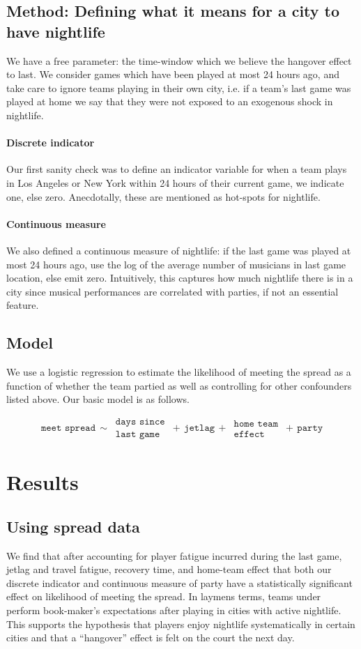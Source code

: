 \documentclass[letterpaper,12pt]{article}
\begin{document}
\subsection{Method: Defining what it means for a city to have nightlife}
We have a free parameter: the time-window which we believe the hangover effect
to last. We consider games which have been played at most 24 hours ago, and take care to ignore
teams playing in their own city, i.e. if a team's last game was played at home  we say that they were not exposed to an exogenous shock in nightlife.

\paragraph{Discrete indicator}
Our first sanity check was to define an indicator variable for when a team plays in 
Los Angeles or New York within 24 hours of their current game, we indicate one, else zero. Anecdotally, these are mentioned as hot-spots for
nightlife.

\paragraph{Continuous measure}
We also defined a continuous measure of nightlife:
if the last game was played at most 24 hours ago, use the log of the average number
of musicians in last game location, else emit zero. Intuitively, this captures
how much nightlife there is in a city since musical performances are correlated
with parties, if not an essential feature.

\subsection{Model} We use a logistic regression to estimate the likelihood of meeting
the spread as a function of whether the team partied as well as controlling for other confounders
listed above. Our basic model is as follows.

\[
\texttt{meet spread} \,  \sim \, \substack{\texttt{days since} \\ \texttt{last game}} \, + \, \texttt{jetlag} \, + \, \substack{\texttt{home team} \\ \texttt{effect}} \, + \, \texttt{party}
\]

\section{Results}
\subsection{Using spread data}
We find that after accounting for player fatigue incurred during the last game, jetlag and travel fatigue, recovery time, and home-team effect that both our discrete indicator and continuous measure of party
have a statistically significant effect on likelihood of meeting the spread.
In laymens terms, teams under perform book-maker's expectations after playing in cities 
with active nightlife.
This supports the hypothesis that players enjoy nightlife systematically in certain
cities and that a ``hangover'' effect is felt on the court the next day.
\end{document}
